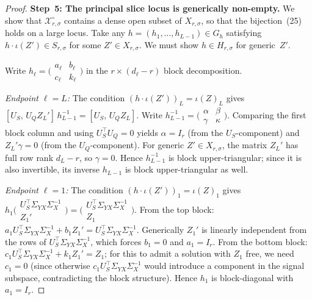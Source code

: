 \documentclass{article}
\theoremstyle{definition}
\begin{document}
\begin{proof}
\medskip
\textbf{Step~5: The principal slice locus is generically non-empty.}
We show that $\mathcal X_{r,\sigma}^{\circ}$ contains a dense open subset of $X_{r,\sigma}$, so that the bijection~(25) holds on a large locus.  Take any $h = (h_1, \dots, h_{L-1}) \in G_h$ satisfying $h \cdot \iota(Z') \in S_{r,\sigma}$ for some $Z' \in X_{r,\sigma}$.  We must show $h \in H_{r,\sigma}$ for generic~$Z'$.

Write $h_\ell = \bigl(\begin{smallmatrix} a_\ell & b_\ell \\ c_\ell & k_\ell \end{smallmatrix}\bigr)$ in the $r \times (d_\ell - r)$ block decomposition.

\emph{Endpoint $\ell = L$:}  The condition $(h \cdot \iota(Z'))_L = \iota(Z)_L$ gives $[U_S,\, U_Q Z_L']\, h_{L-1}^{-1} = [U_S,\, U_Q Z_L]$.  Write $h_{L-1}^{-1} = \bigl(\begin{smallmatrix} \alpha & \beta \\ \gamma & \kappa \end{smallmatrix}\bigr)$.  Comparing the first block column and using $U_S^\top U_Q = 0$ yields $\alpha = I_r$ (from the $U_S$-component) and $Z_L' \gamma = 0$ (from the $U_Q$-component).  For generic $Z' \in X_{r,\sigma}$, the matrix $Z_L'$ has full row rank $d_L - r$, so $\gamma = 0$.  Hence $h_{L-1}^{-1}$ is block upper-triangular; since it is also invertible, its inverse $h_{L-1}$ is block upper-triangular as well.

\emph{Endpoint $\ell = 1$:}  The condition $(h \cdot \iota(Z'))_1 = \iota(Z)_1$ gives $h_1 \bigl(\begin{smallmatrix} U_S^\top \Sigma_{YX}\Sigma_X^{-1} \\ Z_1' \end{smallmatrix}\bigr) = \bigl(\begin{smallmatrix} U_S^\top \Sigma_{YX}\Sigma_X^{-1} \\ Z_1 \end{smallmatrix}\bigr)$.  From the top block: $a_1 U_S^\top \Sigma_{YX}\Sigma_X^{-1} + b_1 Z_1' = U_S^\top \Sigma_{YX}\Sigma_X^{-1}$.  Generically $Z_1'$ is linearly independent from the rows of $U_S^\top \Sigma_{YX}\Sigma_X^{-1}$, which forces $b_1 = 0$ and $a_1 = I_r$.  From the bottom block: $c_1 U_S^\top \Sigma_{YX}\Sigma_X^{-1} + k_1 Z_1' = Z_1$; for this to admit a solution with $Z_1$ free, we need $c_1 = 0$ (since otherwise $c_1 U_S^\top \Sigma_{YX}\Sigma_X^{-1}$ would introduce a component in the signal subspace, contradicting the block structure).  Hence $h_1$ is block-diagonal with $a_1 = I_r$.


\end{proof}
\end{document}
